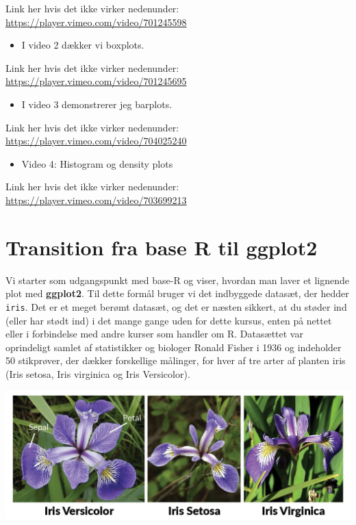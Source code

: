 \documentclass[
]{book}
\providecommand{\tightlist}{%
  \setlength{\itemsep}{0pt}\setlength{\parskip}{0pt}}
\begin{document}
Link her hvis det ikke virker nedenunder: \url{https://player.vimeo.com/video/701245598}

\begin{itemize}
\tightlist
\item
  I video 2 dækker vi boxplots.
\end{itemize}

Link her hvis det ikke virker nedenunder: \url{https://player.vimeo.com/video/701245695}

\begin{itemize}
\tightlist
\item
  I video 3 demonstrerer jeg barplots.
\end{itemize}

Link her hvis det ikke virker nedenunder: \url{https://player.vimeo.com/video/704025240}

\begin{itemize}
\tightlist
\item
  Video 4: Histogram og density plots
\end{itemize}

Link her hvis det ikke virker nedenunder: \url{https://player.vimeo.com/video/703699213}

\hypertarget{transition-fra-base-r-til-ggplot2}{%
\section{Transition fra base R til ggplot2}\label{transition-fra-base-r-til-ggplot2}}

Vi starter som udgangspunkt med base-R og viser, hvordan man laver et lignende plot med \textbf{ggplot2}. Til dette formål bruger vi det indbyggede datasæt, der hedder \texttt{iris}. Det er et meget berømt datasæt, og det er næsten sikkert, at du støder ind (eller har stødt ind) i det mange gange uden for dette kursus, enten på nettet eller i forbindelse med andre kurser som handler om R. Datasættet var oprindeligt samlet af statistikker og biologer Ronald Fisher i 1936 og indeholder 50 stikprøver, der dækker forskellige målinger, for hver af tre arter af planten iris (Iris setosa, Iris virginica og Iris Versicolor).

\includegraphics[width=0.85\linewidth]{plots/iris_picture}
\end{document}
